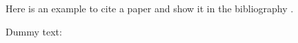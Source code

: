 
Here is an example to cite a paper and show it in the bibliography \cite{zhang2023neuromorphic, zhang2024labits, zhang2024v2ce}.

Dummy text: \lipsum[100]

